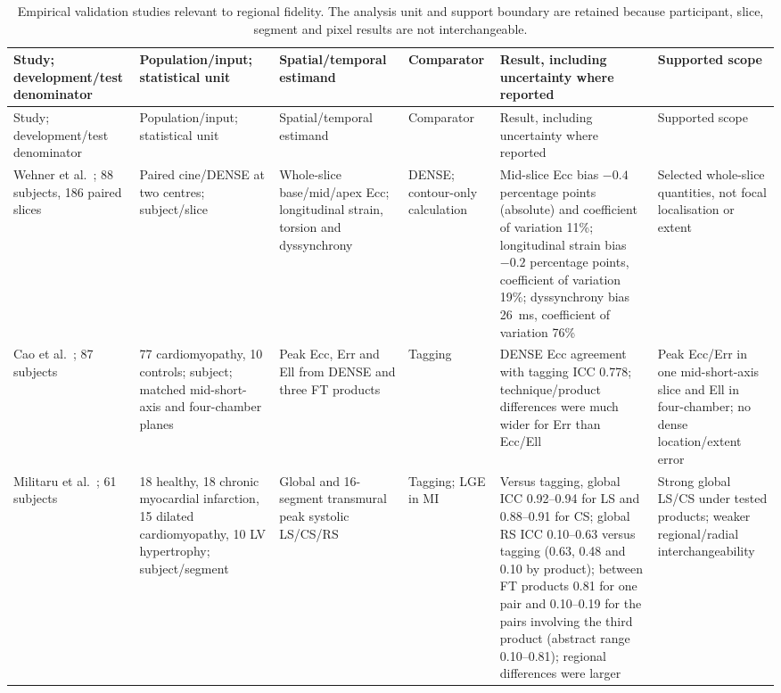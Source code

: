 {\scriptsize\sloppy
\setlength{\tabcolsep}{3pt}
\begin{longtable}{L{0.124\textwidth}L{0.146\textwidth}L{0.157\textwidth}L{0.146\textwidth}L{0.225\textwidth}L{0.112\textwidth}}
\caption{Empirical validation studies relevant to regional fidelity. The analysis unit and support boundary are retained because participant, slice, segment and pixel results are not interchangeable.}\label{tab:evidence}\\
\toprule
Study; development/test denominator & Population/input; statistical unit & Spatial/temporal estimand & Comparator & Result, including uncertainty where reported & Supported scope \\
\midrule
\endfirsthead
\toprule
Study; development/test denominator & Population/input; statistical unit & Spatial/temporal estimand & Comparator & Result, including uncertainty where reported & Supported scope \\
\midrule
\endhead
Wehner et al.~\cite{wehner2018}; 88 subjects, 186 paired slices & Paired cine/DENSE at two centres; subject/slice & Whole-slice base/mid/apex Ecc; longitudinal strain, torsion and dyssynchrony & DENSE; contour-only calculation & Mid-slice Ecc bias $-0.4$ percentage points (absolute) and coefficient of variation 11\%; longitudinal strain bias $-0.2$ percentage points, coefficient of variation 19\%; dyssynchrony bias 26~ms, coefficient of variation 76\% & Selected whole-slice quantities, not focal localisation or extent \\
\addlinespace
Cao et al.~\cite{cao2018}; 87 subjects & 77 cardiomyopathy, 10 controls; subject; matched mid-short-axis and four-chamber planes & Peak Ecc, Err and Ell from DENSE and three FT products & Tagging & DENSE Ecc agreement with tagging ICC 0.778; technique/product differences were much wider for Err than Ecc/Ell & Peak Ecc/Err in one mid-short-axis slice and Ell in four-chamber; no dense location/extent error \\
\addlinespace
Militaru et al.~\cite{militaru2021}; 61 subjects & 18 healthy, 18 chronic myocardial infarction, 15 dilated cardiomyopathy, 10 LV hypertrophy; subject/segment & Global and 16-segment transmural peak systolic LS/CS/RS & Tagging; LGE in MI & Versus tagging, global ICC 0.92--0.94 for LS and 0.88--0.91 for CS; global RS ICC 0.10--0.63 versus tagging (0.63, 0.48 and 0.10 by product); between FT products 0.81 for one pair and 0.10--0.19 for the pairs involving the third product (abstract range 0.10--0.81); regional differences were larger & Strong global LS/CS under tested products; weaker regional/radial interchangeability \\

\end{longtable}}
